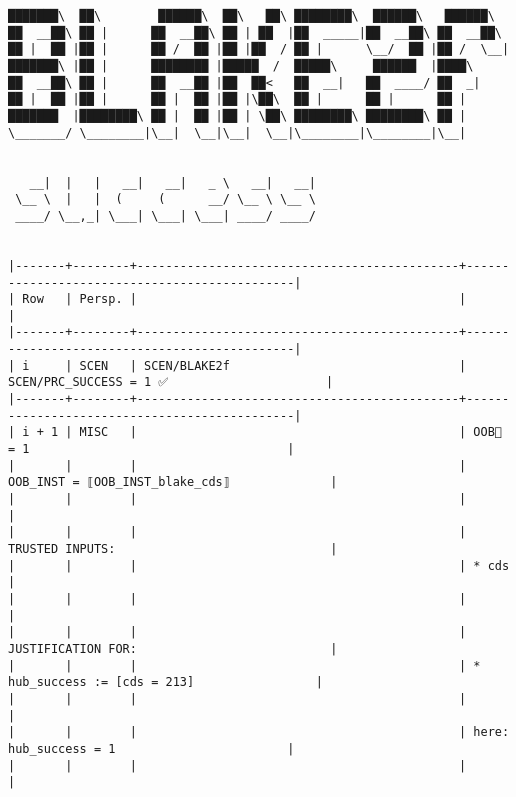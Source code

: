 \documentclass[varwidth=\maxdimen,margin=0.5cm,multi={verbatim}]{standalone}
\begin{document}
\begin{verbatim}
███████\  ██\        ██████\  ██\   ██\ ████████\  ██████\   ██████\
██  __██\ ██ |      ██  __██\ ██ | ██  |██  _____|██  __██\ ██  __██\
██ |  ██ |██ |      ██ /  ██ |██ |██  / ██ |      \__/  ██ |██ /  \__|
███████\ |██ |      ████████ |█████  /  █████\     ██████  |████\
██  __██\ ██ |      ██  __██ |██  ██<   ██  __|   ██  ____/ ██  _|
██ |  ██ |██ |      ██ |  ██ |██ |\██\  ██ |      ██ |      ██ |
███████  |████████\ ██ |  ██ |██ | \██\ ████████\ ████████\ ██ |
\_______/ \________|\__|  \__|\__|  \__|\________|\________|\__|


   __|  |   |   __|   __|   _ \   __|   __|
 \__ \  |   |  (     (      __/ \__ \ \__ \
 ____/ \__,_| \___| \___| \___| ____/ ____/


|-------+--------+---------------------------------------------+----------------------------------------------|
| Row   | Persp. |                                             |                                              |
|-------+--------+---------------------------------------------+----------------------------------------------|
| i     | SCEN   | SCEN/BLAKE2f                                | SCEN/PRC_SUCCESS = 1 ✅                      |
|-------+--------+---------------------------------------------+----------------------------------------------|
| i + 1 | MISC   |                                             | OOB🏴 = 1                                    |
|       |        |                                             | OOB_INST = ⟦OOB_INST_blake_cds⟧              |
|       |        |                                             |                                              |
|       |        |                                             | TRUSTED INPUTS:                              |
|       |        |                                             | * cds                                        |
|       |        |                                             |                                              |
|       |        |                                             | JUSTIFICATION FOR:                           |
|       |        |                                             | * hub_success := [cds = 213]                 |
|       |        |                                             |                                              |
|       |        |                                             | here: hub_success = 1                        |
|       |        |                                             |                                              |

\end{verbatim}
\end{document}
